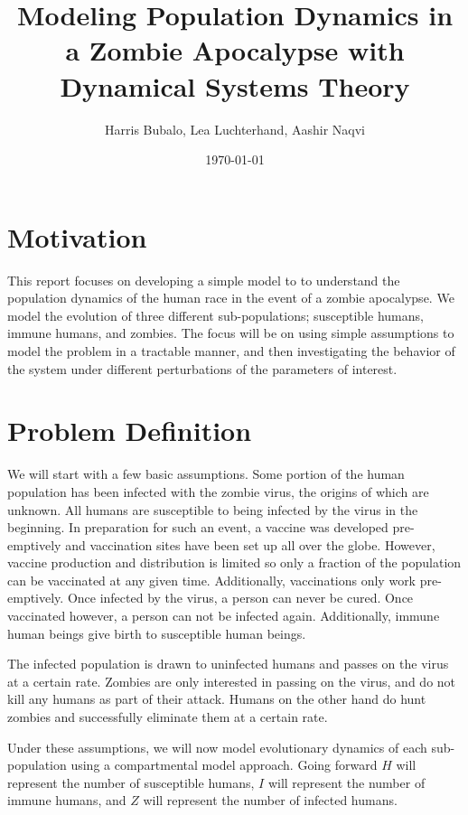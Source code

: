 \documentclass[
	12pt
]{article}
\title{Modeling Population Dynamics in a Zombie Apocalypse with Dynamical Systems Theory}
\date{\today}
\author{Harris Bubalo, Lea Luchterhand, Aashir Naqvi}
\begin{document}
\maketitle
\pagebreak
\tableofcontents
\pagebreak
\section{Motivation}
This report focuses on developing a simple model to to understand the population dynamics of the human race in the event of a zombie apocalypse. We model the evolution of three different sub-populations; susceptible humans, immune humans, and zombies. The focus will be on using simple assumptions to model the problem in a tractable manner, and then investigating the behavior of the system under different perturbations of the parameters of interest.
\section{Problem Definition}
We will start with a few basic assumptions. Some portion of the human population has been infected with the zombie virus, the origins of which are unknown. All humans are susceptible to being infected by the virus in the beginning. In preparation for such an event, a vaccine was developed pre-emptively and vaccination sites have been set up all over the globe. However, vaccine production and distribution is limited so only a fraction of the population can be vaccinated at any given time. Additionally, vaccinations only work pre-emptively. Once infected by the virus, a person can never be cured. Once vaccinated however, a person can not be infected again. Additionally, immune human beings give birth to susceptible human beings.

The infected population is drawn to uninfected humans and passes on the virus at a certain rate. Zombies are only interested in passing on the virus, and do not kill any humans as part of their attack. Humans on the other hand do hunt zombies and successfully eliminate them at a certain rate. 

Under these assumptions, we will now model evolutionary dynamics of each sub-population using a compartmental model approach. Going forward $H$ will represent the number of susceptible humans, $I$ will represent the number of immune humans, and $Z$ will represent the number of infected humans.
\end{document}
